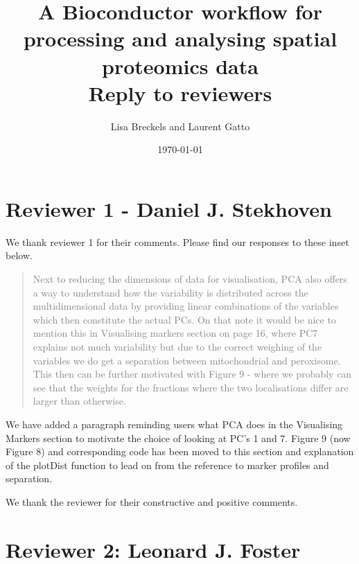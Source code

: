 \documentclass[11pt]{article}
\author{Lisa Breckels and Laurent Gatto}
\date{\today}
\title{A Bioconductor workflow for processing and analysing spatial proteomics data \\ Reply to reviewers}
\begin{document}
\maketitle

\section*{Reviewer 1 - Daniel J. Stekhoven}

We thank reviewer 1 for their comments. Please find our responses to
these inset below.

\begin{quote} \textcolor{gray}{
Next to reducing the dimensions of data for visualisation, PCA also offers a way to understand how the variability is distributed across the multidimensional data by providing linear combinations of the variables which then constitute the actual PCs. On that note it would be nice to mention this in Visualising markers section on page 16, where PC7 explains not much variability but due to the correct weighing of the variables we do get a separation between mitochondrial and peroxisome. This then can be further motivated with Figure 9 - where we probably can see that the weights for the fractions where the two localisations differ are larger than otherwise.}
\end{quote}

We have added a paragraph reminding users what PCA does in the Visualising Markers section to motivate the choice of looking at PC's 1 and 7. Figure 9 (now Figure 8) and corresponding code has been moved to this section and explanation of the plotDist function to lead on from the reference to marker profiles and separation.  



\begin{quote}  \textcolor{gray}{
}
\end{quote}







We thank the reviewer for their constructive and positive comments.

\section*{Reviewer 2: Leonard J. Foster}

\begin{quote}\textcolor{gray}{ }
\end{quote}
\end{document}
